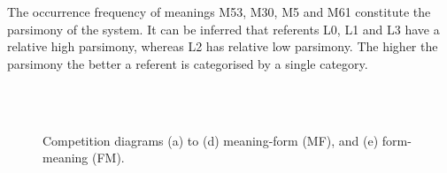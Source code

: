 The occurrence frequency of meanings M53, M30, M5 and M61 constitute the parsimony of the system. It can be inferred that referents L0, L1 and L3 have a relative high parsimony, whereas L2 has relative low parsimony. The higher the parsimony the better a referent is categorised by a single category.

\begin{figure}
\centering
{}
\\
\\
\caption{Competition diagrams (a) to (d) meaning-form (MF), and (e) form-meaning (FM).}
\label{f:st:compCF}
\end{figure}


